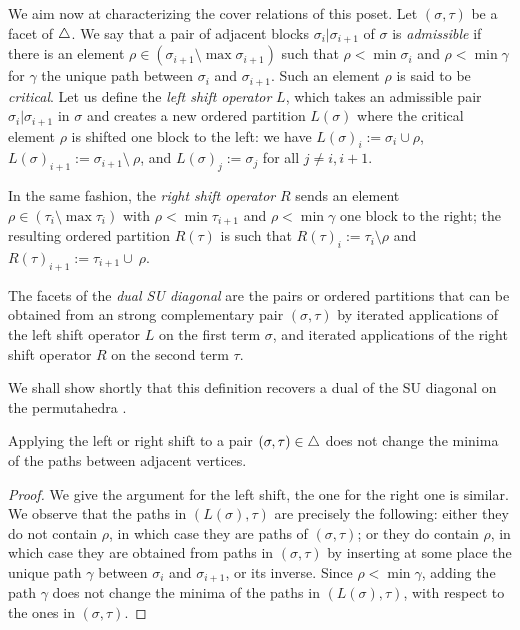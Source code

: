 We aim now at characterizing the cover relations of this poset. 
Let $(\sigma,\tau)$ be a facet of $\triangle$.
We say that a pair of adjacent blocks $\sigma_i | \sigma_{i+1}$ of $\sigma$ is \emph{admissible} if there is an element $\rho \in (\sigma_{i+1} \setminus \max\sigma_{i+1})$ such that $\rho < \min \sigma_{i}$ and $\rho < \min \gamma$ for $\gamma$ the unique path between $\sigma_i$ and $\sigma_{i+1}$. 
Such an element $\rho$ is said to be \emph{critical}. 
Let us define the \emph{left shift operator} $L$, which takes an admissible pair $\sigma_i | \sigma_{i+1}$ in $\sigma$ and creates a new ordered partition $L(\sigma)$ where the critical element $\rho$ is shifted one block to the left: we have $L(\sigma)_i := \sigma_i \cup \rho$, $L(\sigma)_{i+1} := \sigma_{i+1} \setminus \ \rho$, and $L(\sigma)_{j}:=\sigma_j$ for all $j\neq i, i+1$. 

In the same fashion, the \emph{right shift operator} $R$ sends an element $\rho \in (\tau_{i} \setminus \max\tau_{i})$ with $\rho < \min \tau_{i+1}$ and $\rho < \min \gamma$ one block to the right; the resulting ordered partition $R(\tau)$ is such that $R(\tau)_i := \tau_i \setminus \rho$ and $R(\tau)_{i+1} := \tau_{i+1} \cup \ \rho$.

\begin{definition}
    The facets of the \emph{dual SU diagonal} are the pairs or ordered partitions that can be obtained from an strong complementary pair $(\sigma,\tau)$ by iterated applications of the left shift operator $L$ on the first term $\sigma$, and iterated applications of the right shift operator $R$ on the second term $\tau$. 
\end{definition}

We shall show shortly that this definition recovers a dual of the SU diagonal on the permutahedra \cite{SaneblidzeUmble04}.

\begin{lemma}
\label{l:minima-invariance}
    Applying the left or right shift to a pair $(\sigma,\tau) \in \triangle$ does not change the minima of the paths between adjacent vertices. 
\end{lemma}

\begin{proof}
We give the argument for the left shift, the one for the right one is similar. 
We observe that the paths in $(L(\sigma), \tau)$ are precisely the following: either they do not contain $\rho$, in which case they are paths of $(\sigma, \tau)$; or they do contain $\rho$, in which case they are obtained from paths in $(\sigma,\tau)$ by inserting at some place the unique path $\gamma$ between $\sigma_i$ and $\sigma_{i+1}$, or its inverse. 
Since $\rho < \min \gamma$, adding the path $\gamma$ does not change the minima of the paths in $(L(\sigma), \tau)$, with respect to the ones in $(\sigma, \tau)$.
\end{proof}

